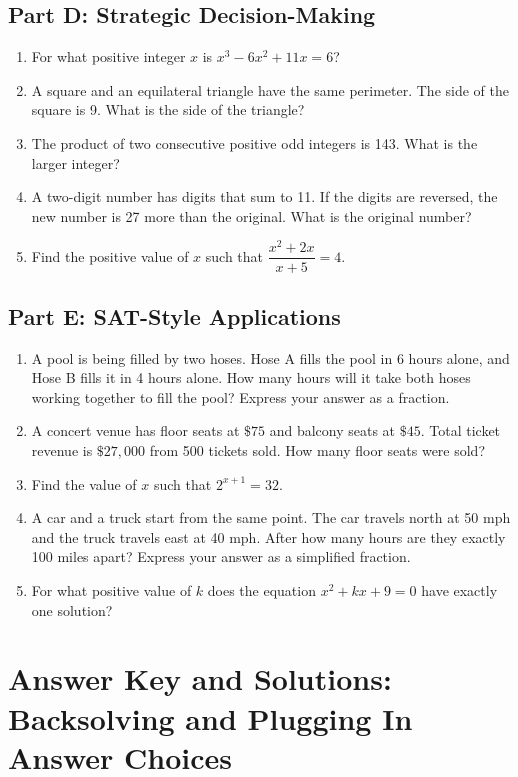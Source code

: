 \documentclass[14pt]{extarticle}
\begin{document}
\subsection*{Part D: Strategic Decision-Making}
\begin{enumerate}
  \item For what positive integer \(x\) is \(x^3 - 6x^2 + 11x = 6\)?
  \item A square and an equilateral triangle have the same perimeter. The side of the square is 9. What is the side of the triangle?
  \item The product of two consecutive positive odd integers is 143. What is the larger integer?
  \item A two-digit number has digits that sum to 11. If the digits are reversed, the new number is 27 more than the original. What is the original number?
  \item Find the positive value of \(x\) such that \(\dfrac{x^2 + 2x}{x + 5} = 4\).
\end{enumerate}

\subsection*{Part E: SAT-Style Applications}
\begin{enumerate}
  \item A pool is being filled by two hoses. Hose A fills the pool in 6 hours alone, and Hose B fills it in 4 hours alone. How many hours will it take both hoses working together to fill the pool? Express your answer as a fraction.
  \item A concert venue has floor seats at \(\$75\) and balcony seats at \(\$45\). Total ticket revenue is \(\$27{,}000\) from 500 tickets sold. How many floor seats were sold?
  \item Find the value of \(x\) such that \(2^{x+1} = 32\).
  \item A car and a truck start from the same point. The car travels north at 50 mph and the truck travels east at 40 mph. After how many hours are they exactly 100 miles apart? Express your answer as a simplified fraction.
  \item For what positive value of \(k\) does the equation \(x^2 + kx + 9 = 0\) have exactly one solution?
\end{enumerate}

\newpage

\section*{Answer Key and Solutions: Backsolving and Plugging In Answer Choices}
\end{document}
